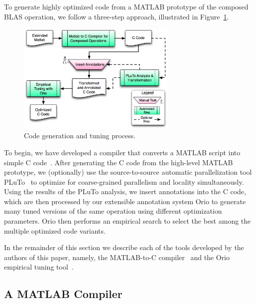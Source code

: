 \documentclass[runningheads]{llncs}
\begin{document}
To generate highly optimized code from a MATLAB prototype of the composed
BLAS operation, we follow a three-step approach, illustrated in
Figure~\ref{fig:process}.  
%
\begin{figure}
\vspace{-.2in}
\centering
\includegraphics[width=3in]{figures/process.png}
\caption{Code generation and tuning process.}
\label{fig:process}
\vspace{-.2in}
\end{figure}
%
To begin, we have developed a compiler that
converts a MATLAB script into simple C code~\cite{Siek}.  After generating
the C code from the high-level MATLAB prototype, we (optionally) use 
the source-to-source automatic parallelization tool PLuTo~\cite{Pluto} %
to optimize for coarse-grained parallelism and locality simultaneously. Using
the results of the PLuTo analysis, we insert annotations into the C code,
which are then processed by our extensible annotation system Orio to generate
many tuned versions of the same operation using different optimization
parameters. Orio then performs an empirical search to select the best among
the multiple optimized code variants.


In the remainder of this section we describe each of the tools developed by
the authors of this paper, namely, the MATLAB-to-C compiler~\cite{Siek} and the Orio
empirical tuning tool~\cite{Norris:2007,Hartono:IPDPS09}.

\subsection{A MATLAB Compiler}
\label{sec:matlab}
\end{document}

